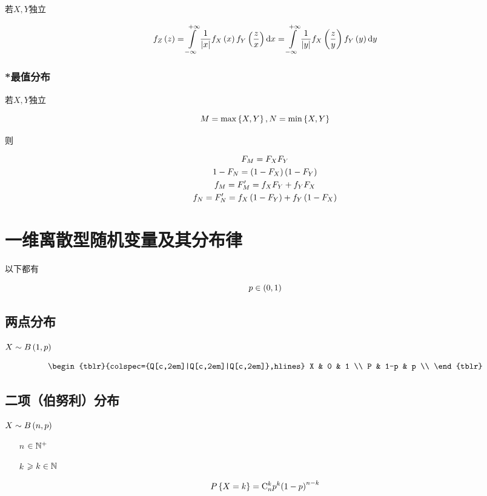 \documentclass{article}
\begin{document}
若$X,Y$独立

\[f_Z\left(z\right)
    =\int\limits_{-\infty}^{+\infty}\frac1{\left|x\right|}f_X\left(x\right)f_Y\left(\frac zx\right)\mathrm d x
    =\int\limits_{-\infty}^{+\infty}\frac1{\left|y\right|}f_X\left(\frac zy\right)f_Y\left(y\right)\mathrm d y\]

\subsubsection{*最值分布}

若$X,Y$独立

\[M=\max\left\{X,Y\right\},N=\min\left\{X,Y\right\}\]

则

\[\begin{gathered}
        F_M=F_XF_Y\\
        1-F_N=\left(1-F_X\right)\left(1-F_Y\right)\\
        f_M=F^\prime_M=f_XF_Y+f_YF_X\\
        f_N=F^\prime_N=f_X\left(1-F_Y\right)+f_Y\left(1-F_X\right)
    \end{gathered}\]


\section{一维离散型随机变量及其分布律}

以下都有

\[p\in\left(0,1\right)\]

\subsection{两点分布}

$X\sim B\left(1,p\right)$

\[\begin{tblr}{colspec={Q[c,2em]|Q[c,2em]|Q[c,2em]},hlines}
        X & 0   & 1 \\
        P & 1-p & p \\
    \end{tblr}\]

\subsection{二项（伯努利）分布}

$X\sim B\left(n,p\right)$

\begin{enumerate}
    \item [$n$] $\in\mathbb N^+$
    \item [$k$] $\geqslant k\in\mathbb N$
\end{enumerate}

\[P\left\{X=k\right\}=\mathrm C_n^kp^k{\left(1-p\right)}^{n-k}\]
\end{document}
